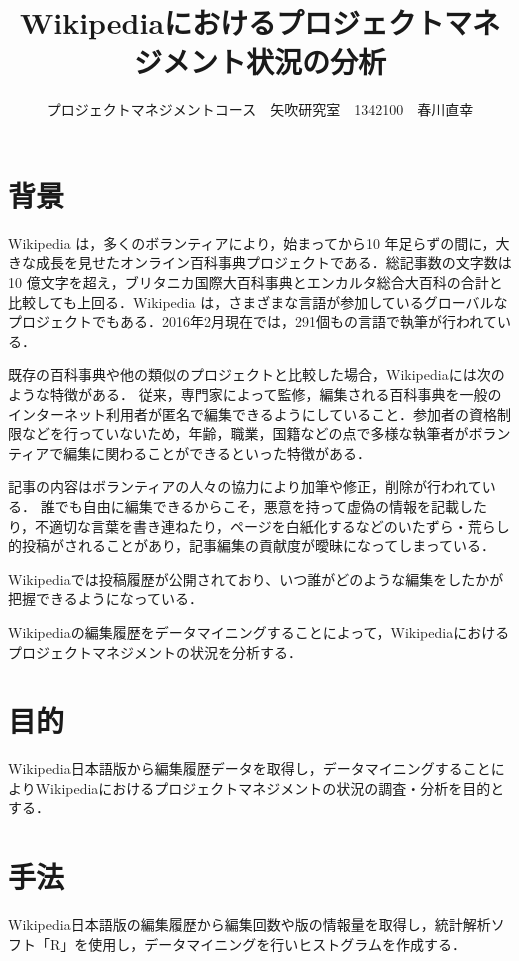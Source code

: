 \documentclass[uplatex,twocolumn,dvipdfmx]{jsarticle}
\title{\vspace{-5mm}\fontsize{14pt}{0pt}\selectfont Wikipediaにおけるプロジェクトマネジメント状況の分析}
\author{\normalsize プロジェクトマネジメントコース　矢吹研究室　1342100　春川直幸}
\date{}
\begin{document}
\fontsize{10.5pt}{\baselineskip}\selectfont
\maketitle


\section{背景}

Wikipedia は，多くのボランティアにより，始まってから10 年足らずの間に，大きな成長を見せたオンライン百科事典プロジェクトである．総記事数の文字数は10 億文字を超え，ブリタニカ国際大百科事典とエンカルタ総合大百科の合計と比較しても上回る．Wikipedia は，さまざまな言語が参加しているグローバルなプロジェクトでもある\cite{wikirevo}．2016年2月現在では，291個もの言語で執筆が行われている．

既存の百科事典や他の類似のプロジェクトと比較した場合，Wikipediaには次のような特徴がある．
従来，専門家によって監修，編集される百科事典を一般のインターネット利用者が匿名で編集できるようにしていること．参加者の資格制限などを行っていないため，年齢，職業，国籍などの点で多様な執筆者がボランティアで編集に関わることができるといった特徴がある\cite{wiki}．

記事の内容はボランティアの人々の協力により加筆や修正，削除が行われている\cite{hensyuu}．
誰でも自由に編集できるからこそ，悪意を持って虚偽の情報を記載したり，不適切な言葉を書き連ねたり，ページを白紙化するなどのいたずら・荒らし的投稿がされることがあり，記事編集の貢献度が曖昧になってしまっている\cite{wiki}．

Wikipediaでは投稿履歴が公開されており、いつ誰がどのような編集をしたかが把握できるようになっている\cite{wiki}．

Wikipediaの編集履歴をデータマイニングすることによって，Wikipediaにおけるプロジェクトマネジメントの状況を分析する．

\section{目的}

Wikipedia日本語版から編集履歴データを取得し，データマイニングすることによりWikipediaにおけるプロジェクトマネジメントの状況の調査・分析を目的とする．

\section{手法}

Wikipedia日本語版の編集履歴から編集回数や版の情報量を取得し，統計解析ソフト「R」を使用し，データマイニングを行いヒストグラムを作成する．
\end{document}
